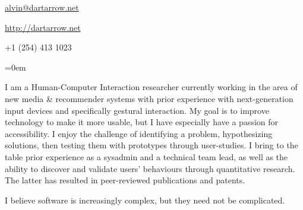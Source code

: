 \documentclass[a4paper]{scrartcl}
\newcommand{\Description}[1]{\hangindent=0em\hangafter=0\noindent\footnotesize{#1}\par\normalsize\vspace{1em}} %
\newcommand{\Redvline}[0]{\vspace{0.5em}\noindent{\color{ThemeColor}\rule{18cm}{0.4pt}}}
\newcommand{\MyName}[1]{\noindent{\textsc{\LARGE{\color{ThemeColor}#1}}}} %
\newcommand{\BlockTitle}[1]{\textsc{\vspace{0.15em}}\noindent{\spacedlowsmallcaps{#1}}\vspace{1em}}
\begin{document}
\thispagestyle{empty} %


\MyName{Alvin Jude} %

\vspace{-0.3em}

\Redvline

\begin{multicols}{3}
\href{mailto:alvin@dartarrow.net}{alvin@dartarrow.net} %

\columnbreak

\begin{center}
\href{http://dartarrow.net}{http://dartarrow.net} %
\end{center}

\columnbreak

\begin{flushright}
+1 (254) 413 1023
\end{flushright}

\end{multicols}

\vspace{1em} %


\Description{I am a Human-Computer Interaction researcher currently working in the area of new media \& recommender systems with prior experience with next-generation input devices and specifically gestural interaction.
My goal is to improve technology to make it more usable, but I have especially have a passion for accessibility.
I enjoy the challenge of identifying a problem, hypothesizing solutions, then testing them with prototypes through user-studies.
I bring to the table prior experience as a sysadmin and a technical team lead, as well as the ability to discover and validate users' behaviours through quantitative research.
The latter has resulted in peer-reviewed publications and patents.

I believe software is increasingly complex, but they need not be complicated.
}

\Redvline
\end{document}
